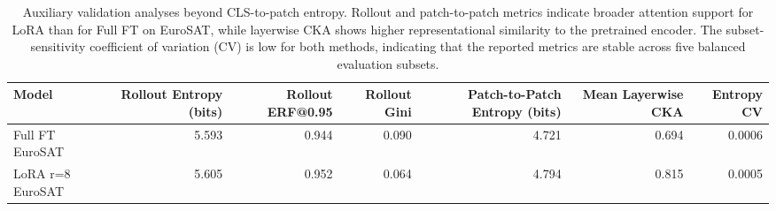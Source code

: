 \begin{table}[t]
\centering
\caption{Auxiliary validation analyses beyond CLS-to-patch entropy. Rollout and patch-to-patch metrics indicate broader attention support for LoRA than for Full FT on EuroSAT, while layerwise CKA shows higher representational similarity to the pretrained encoder. The subset-sensitivity coefficient of variation (CV) is low for both methods, indicating that the reported metrics are stable across five balanced evaluation subsets.}
\label{tab:auxiliary-validation}
\small
\begin{tabular}{lrrrrrr}
\toprule
Model & Rollout Entropy (bits) & Rollout ERF@0.95 & Rollout Gini & Patch-to-Patch Entropy (bits) & Mean Layerwise CKA & Entropy CV \\
\midrule
Full FT EuroSAT & 5.593 & 0.944 & 0.090 & 4.721 & 0.694 & 0.0006 \\
LoRA r=8 EuroSAT & 5.605 & 0.952 & 0.064 & 4.794 & 0.815 & 0.0005 \\
\bottomrule
\end{tabular}
\end{table}
